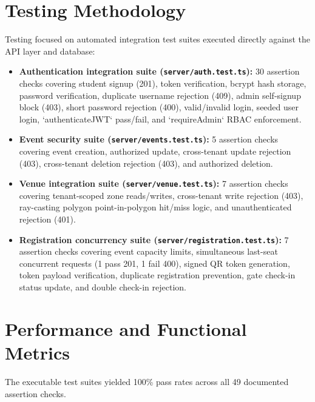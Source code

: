 \documentclass[11pt,a4paper]{report}
\begin{document}
\section{Testing Methodology}
Testing focused on automated integration test suites executed directly against the API layer and database:
\begin{itemize}
  \item \textbf{Authentication integration suite (\texttt{server/auth.test.ts}):} 30 assertion checks covering student signup (201), token verification, bcrypt hash storage, password verification, duplicate username rejection (409), admin self-signup block (403), short password rejection (400), valid/invalid login, seeded user login, `authenticateJWT` pass/fail, and `requireAdmin` RBAC enforcement.
  \item \textbf{Event security suite (\texttt{server/events.test.ts}):} 5 assertion checks covering event creation, authorized update, cross-tenant update rejection (403), cross-tenant deletion rejection (403), and authorized deletion.
  \item \textbf{Venue integration suite (\texttt{server/venue.test.ts}):} 7 assertion checks covering tenant-scoped zone reads/writes, cross-tenant write rejection (403), ray-casting polygon point-in-polygon hit/miss logic, and unauthenticated rejection (401).
  \item \textbf{Registration concurrency suite (\texttt{server/registration.test.ts}):} 7 assertion checks covering event capacity limits, simultaneous last-seat concurrent requests (1 pass 201, 1 fail 400), signed QR token generation, token payload verification, duplicate registration prevention, gate check-in status update, and double check-in rejection.
\end{itemize}

\section{Performance and Functional Metrics}
The executable test suites yielded 100\% pass rates across all 49 documented assertion checks.
\end{document}
